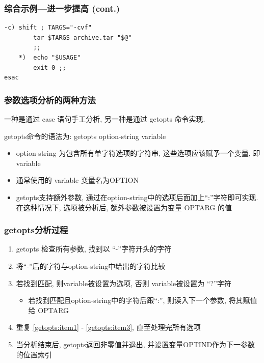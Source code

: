 \documentclass[compress]{beamer}
\begin{document}
\begin{frame}[fragile]
\frametitle{综合示例---进一步提高 (cont.)}

\begin{lstlisting}[firstnumber=last]
    -c) shift ; TARGS="-cvf"
        tar $TARGS archive.tar "$@"
        ;;
    *)  echo "$USAGE"
        exit 0 ;;
esac
\end{lstlisting}
\end{frame}

\begin{frame}
\frametitle{参数选项分析的两种方法}

一种是通过 \alert{case} 语句手工分析, 另一种是通过 \alert{getopts} 命令实现.

\alert{getopts}命令的语法为: getopts option-string variable

\begin{itemize}
\item  option-string 为包含所有单字符选项的字符串, 这些选项应该赋予一个变量, 即 variable
\item 通常使用的 variable 变量名为OPTION
\item {getopts}支持额外参数, 通过在option-string中的选项后面加上``:''字符即可实现.
在这种情况下, 选项被分析后, 额外参数被设置为变量 OPTARG 的值

\end{itemize}

\end{frame}


\begin{frame}
\frametitle{getopts分析过程}
\begin{enumerate}[<+-|alert@+>]
    \item \label{getopts:item1} {getopts} 检查所有参数, 找到以 ``-''字符开头的字符
    \item 将``-''后的字符与option-string中给出的字符比较
    \item \label{getopts:item3} 若找到匹配, 则variable被设置为选项, 否则 variable被设置为 ``?''字符
        \begin{itemize}
            \item 若找到匹配且option-string中的字符后跟``:'', 则读入下一个参数, 将其赋值给 OPTARG
        \end{itemize}
    \item 重复 \ref{getopts:item1} - \ref{getopts:item3}, 直至处理完所有选项
    \item 当分析结束后, {getopts}返回非零值并退出, 并设置变量OPTIND作为下一参数的位置索引
\end{enumerate}
\end{frame}
\end{document}
